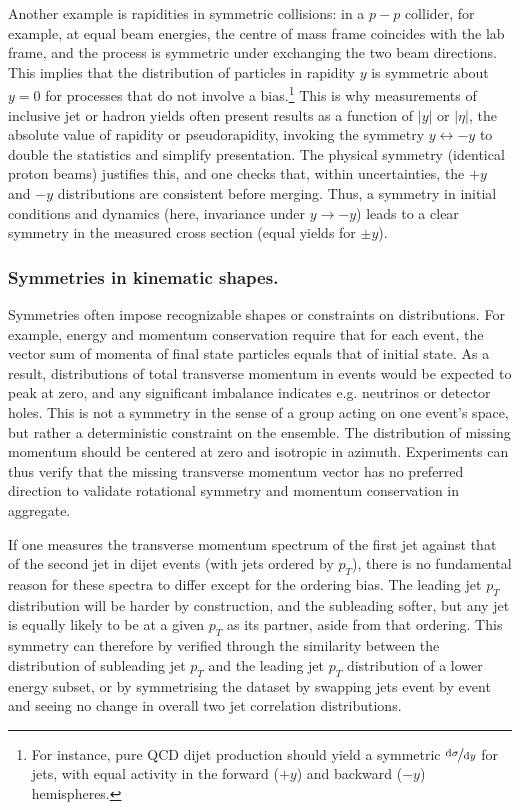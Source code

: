             Another example is rapidities in symmetric collisions: in a $p-p$ collider, for example, at equal beam energies, the centre of mass frame coincides with the lab frame, and the process is symmetric under exchanging the two beam directions.
            This implies that the distribution of particles in rapidity $y$ is symmetric about $y=0$ for processes that do not involve a bias.\footnote{For instance, pure QCD dijet production should yield a symmetric $\nicefrac{\dd\sigma}{\dd y}$ for jets, with equal activity in the forward ($+y$) and backward ($-y$) hemispheres.}
            This is why measurements of inclusive jet or hadron yields often present results as a function of $|y|$ or $|\eta|$, the absolute value of rapidity or pseudorapidity, invoking the symmetry $y \leftrightarrow -y$ to double the statistics and simplify presentation.
            The physical symmetry (identical proton beams) justifies this, and one checks that, within uncertainties, the $+y$ and $-y$ distributions are consistent before merging.
            Thus, a symmetry in initial conditions and dynamics (here, invariance under $y\to -y$) leads to a clear symmetry in the measured cross section (equal yields for $\pm y$).

        \subsubsection{Symmetries in kinematic shapes.}
            Symmetries often impose recognizable shapes or constraints on distributions.
            For example, energy and momentum conservation require that for each event, the vector sum of momenta of final state particles equals that of initial state.
            As a result, distributions of total transverse momentum in events would be expected to peak at zero, and any significant imbalance indicates e.g. neutrinos or detector holes.
            This is not a symmetry in the sense of a group acting on one event's space, but rather a deterministic constraint on the ensemble.
            The distribution of missing momentum should be centered at zero and isotropic in azimuth.
            Experiments can thus verify that the missing transverse momentum vector has no preferred direction to validate rotational symmetry and momentum conservation in aggregate.
            
            If one measures the transverse momentum spectrum of the first jet against that of the second jet in dijet events (with jets ordered by $p_T$), there is no fundamental reason for these spectra to differ except for the ordering bias.
            The leading jet $p_T$ distribution will be harder by construction, and the subleading softer, but any jet is equally likely to be at a given $p_T$ as its partner, aside from that ordering.
            This symmetry can therefore by verified through the similarity between the distribution of subleading jet $p_T$ and the leading jet $p_T$ distribution of a lower energy subset, or by symmetrising the dataset by swapping jets event by event and seeing no change in overall two jet correlation distributions.
            
